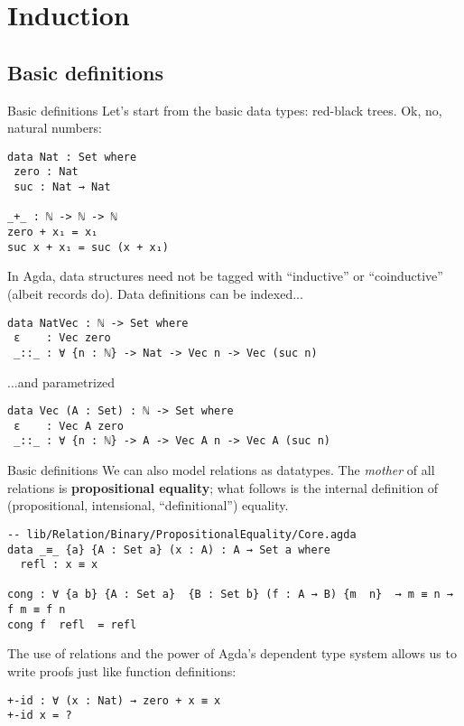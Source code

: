 \documentclass[t,aspectratio=169,9pt]{beamer}
\begin{document}
\section[induction]{Induction}
\subsection[induction]{Basic definitions}
\begin{frame}[fragile]{Basic definitions}
  Let's start from the basic data types: red-black trees. Ok, no, natural numbers:
\begin{verbatim}
data Nat : Set where
 zero : Nat
 suc : Nat → Nat

_+_ : ℕ -> ℕ -> ℕ
zero + x₁ = x₁
suc x + x₁ = suc (x + x₁)
\end{verbatim}
  In Agda, data structures need not be tagged with ``inductive'' or
  ``coinductive'' (albeit records do).
  Data definitions can be indexed...
\begin{verbatim}
data NatVec : ℕ -> Set where
 ε    : Vec zero
 _::_ : ∀ {n : ℕ} -> Nat -> Vec n -> Vec (suc n)
\end{verbatim}
...and parametrized
\begin{verbatim}
data Vec (A : Set) : ℕ -> Set where
 ε    : Vec A zero
 _::_ : ∀ {n : ℕ} -> A -> Vec A n -> Vec A (suc n)
\end{verbatim}
\end{frame}

\begin{frame}[fragile]{Basic definitions}
  We can also model relations as datatypes. The {\it mother} of all relations is
  {\bf propositional equality}; what follows is the internal definition of
  (propositional, intensional, ``definitional'') equality.
\begin{verbatim}
-- lib/Relation/Binary/PropositionalEquality/Core.agda
data _≡_ {a} {A : Set a} (x : A) : A → Set a where
  refl : x ≡ x

cong : ∀ {a b} {A : Set a}  {B : Set b} (f : A → B) {m  n}  → m ≡ n → f m ≡ f n
cong f  refl  = refl
\end{verbatim}
The use of relations and the power of Agda's dependent type system allows us to
write proofs just like function definitions:
\begin{verbatim}
+-id : ∀ (x : Nat) → zero + x ≡ x
+-id x = ?
\end{verbatim}
\end{frame}
\end{document}
